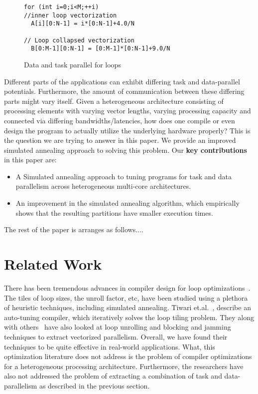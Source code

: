 \documentclass[10pt, conference, compsocconf]{IEEEtran}
\begin{document}
\begin{figure}[h!]
  \centering
\begin{verbatim}
for (int i=0;i<M;++i)
//inner loop vectorization
  A[i][0:N-1] = i*[0:N-1]+4.0/N

// Loop collapsed vectorization
  B[0:M-1][0:N-1] = [0:M-1]*[0:N-1]+9.0/N
\end{verbatim}

  \caption{Data and task parallel for loops}
  \label{fig:3}
\end{figure}

Different parts of the applications can exhibit differing task and
data-parallel potentials. Furthermore, the amount of communication
between these differing parts might vary itself. Given a heterogeneous
architecture consisting of processing elements with varying vector
lengths, varying processing capacity and connected via differing
bandwidths/latencies, how does one compile or even design the program to
actually utilize the underlying hardware properly? This is the question
we are trying to answer in this paper. We provide an improved simulated
annealing approach to solving this problem. Our \textbf{key
  contributions} in this paper are:

\begin{itemize}
\item A Simulated annealing approach to tuning programs for task and
  data parallelism across heterogeneous multi-core architectures.
\item An improvement in the simulated annealing algorithm, which
  empirically shows that the resulting partitions have smaller execution
  times.
\end{itemize}

The rest of the paper is arranges as follows....

\section{Related Work}
\label{sec:related-work}

There has been tremendous advances in compiler design for loop
optimizations~\cite{ubon08,atiw09,tkis00}. The tiles of loop sizes, the
unroll factor, etc, have been studied using a plethora of heuristic
techniques, including simulated annealing. Tiwari et.al.~\cite{atiw09},
describe an auto-tuning compiler, which iteratively solves the loop
tiling problem. They along with others~\cite{tkis00} have also looked at
loop unrolling and blocking and jamming techniques to extract vectorized
parallelism. Overall, we have found their techniques to be quite
effective in real-world applications. What, this optimization literature
does not address is the problem of compiler optimizations for a
heterogeneous processing architecture. Furthermore, the researchers have
also not addressed the problem of extracting a combination of task and
data-parallelism as described in the previous section. 
\end{document}
